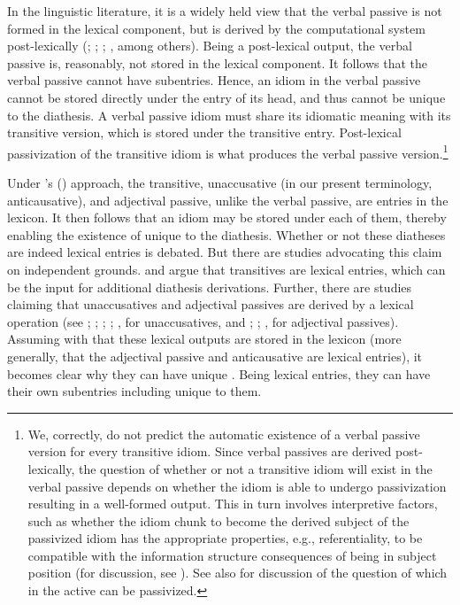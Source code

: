 \documentclass[output=paper]{langsci/langscibook}
\begin{document}
In the linguistic literature, it is a widely held view that the verbal passive
is not formed in the lexical component, but is derived by the computational
system post-lexically (\citealt{BakJohRob1989}; \citealt{Collins2005};
\citealt{HorSil2008}; \citealt{Meltzer-Asscher2012}, among others).
Being a post-lexical output, the verbal passive is, reasonably, not stored in
the lexical component. It follows that the verbal passive cannot have
subentries. Hence, an idiom in the verbal passive cannot be stored directly
under the entry of its head, and thus cannot be unique to the diathesis. A
verbal passive idiom must share its idiomatic meaning with its transitive
version, which is stored under the transitive entry. Post-lexical passivization
of the transitive idiom is what produces the verbal passive
version.\footnote{We, correctly, do not predict the automatic existence of a
    verbal passive version for every transitive idiom. Since verbal passives
    are derived post-lexically, the question of whether or not a transitive
    idiom will exist in the verbal passive depends on whether the
    idiom is able to undergo passivization resulting in a
    well-formed output.  This in turn involves interpretive factors, such as
    whether the idiom chunk to become the derived subject of the
    passivized idiom has the appropriate properties, e.g.,
    referentiality, to be compatible with the information structure
consequences of being in subject position (for discussion, see
\citealt{Ruwet1991}). See also \citet{NunSagWas1994} for discussion of the
question of which  in the active can be passivized.}

Under \citeauthor{HorSil2009}'s (\citeyear{HorSil2009,HorSil2019}) approach,
the transitive, unaccusative (in our present terminology,
anticausative), and adjectival passive, unlike the verbal passive, are entries
in the lexicon. It then follows that an idiom may be stored under each of them,
thereby enabling the existence of  unique to the diathesis. Whether
or not these diatheses are indeed lexical entries is debated. But there are
studies advocating this claim on independent grounds. \citet{HorSil2011} and
\citet{Reinhart2002} argue that transitives are lexical entries, which can be
the input for additional diathesis derivations. Further, there are studies
claiming that unaccusatives and adjectival passives are derived by a lexical
operation (see \citealt{Chierchia2004}; \citealt{HorSil2011};
\citealt{LevRapHov1995}; \citealt{Koontz-Garboden2009}; \citealt{Reinhart2002},
for unaccusatives, and \citealt{HorSil2008}; \citealt{LevRap1986};
\citealt{Meltzer-Asscher2011}, for adjectival passives). Assuming with
\textcite{HorSil2008,HorSil2011} that these lexical outputs are stored in the
lexicon (more generally, that the adjectival passive and anticausative are
lexical entries), it becomes clear why they can have unique . Being
lexical entries, they can have their own subentries including 
unique to them.
\end{document}
